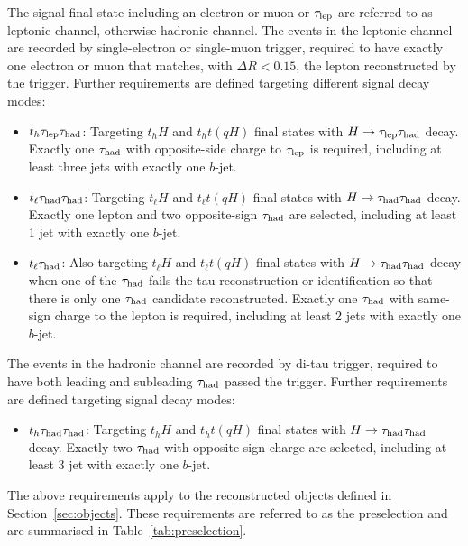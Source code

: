 The signal final state including an electron or muon or $\tau_{\mathrm{lep}}$ are referred to as leptonic channel, otherwise hadronic channel.
The events in the leptonic channel are recorded by single-electron or single-muon trigger, required to have exactly one electron or muon that matches, with $\Delta R < 0.15$, the lepton reconstructed by the trigger. Further requirements are defined targeting different signal decay modes:  
\begin{itemize}
\item $t_h\tau_{\mathrm{lep}} \tau_{\mathrm{had}}$: Targeting $t_hH$ and $t_ht(qH)$ final states with $H\to\tau_{\mathrm{lep}} \tau_{\mathrm{had}}$ decay. Exactly one $\tau_{\mathrm{had}}$ with opposite-side charge to $\tau_{\mathrm{lep}}$ is required, including at least three jets with exactly one $b$-jet.
\item $t_{\ell}\tau_{\mathrm{had}} \tau_{\mathrm{had}}$: Targeting $t_{\ell}H$ and $t_{\ell}t(qH)$ final states with $H\to\tau_{\mathrm{had}} \tau_{\mathrm{had}}$ decay. Exactly one lepton and two opposite-sign $\tau_{\mathrm{had}}$ are selected, including at least 1 jet with exactly one $b$-jet.
\item $t_{\ell}\tau_{\mathrm{had}}$: Also targeting $t_{\ell}H$ and $t_{\ell}t(qH)$ final states with $H\to\tau_{\mathrm{had}} \tau_{\mathrm{had}}$ decay when one of the $\tau_{\mathrm{had}}$ fails the tau reconstruction or identification so that there is only
  one $\tau_{\mathrm{had}}$ candidate reconstructed. Exactly one $\tau_{\mathrm{had}}$ with same-sign charge to the lepton is required, including at least 2 jets with exactly one $b$-jet.
\end{itemize}

The events in the hadronic channel are recorded by di-tau trigger, required to have both leading and subleading $\tau_{\mathrm{had}}$ passed the trigger. Further requirements are defined targeting signal decay modes:
\begin{itemize}
\item $t_h\tau_{\mathrm{had}} \tau_{\mathrm{had}}$: Targeting $t_hH$ and $t_ht(qH)$ final states with $H\to\tau_{\mathrm{had}} \tau_{\mathrm{had}}$ decay. Exactly two $\tau_{\mathrm{had}}$ with opposite-sign charge are selected, including at least 3 jet with exactly one $b$-jet.
\end{itemize}

The above requirements apply to the reconstructed objects defined in Section~\ref{sec:objects}.
These requirements are referred to as the preselection and are summarised in Table~\ref{tab:preselection}. 

